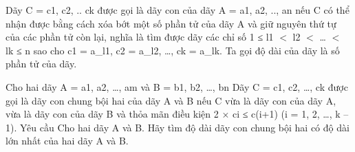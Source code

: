 Dãy C = c1, c2, .. ck được gọi là dãy con của dãy A = a1, a2, .., an nếu C có thể nhận được bằng cách xóa bớt một số phần tử của dãy A và giữ nguyên thứ tự của các phần tử còn lại, nghĩa là tìm được dãy các chỉ số 1 ≤ l1 $<$ l2 $<$ … $<$ lk ≤ n sao cho c1 = a\_l1, c2 = a\_l2, …, ck = a\_lk. Ta gọi độ dài của dãy là số phần tử của dãy.

Cho hai dãy A = a1, a2, …, am và B = b1, b2, …, bn Dãy C = c1, c2, …, ck được gọi là dãy con chung bội hai của dãy A và B nếu C vừa là dãy con của dãy A, vừa là dãy con của dãy B và thỏa mãn điều kiện 2 × ci ≤ c(i+1) (i = 1, 2, …, k – 1).
Yêu cầu
Cho hai dãy A và B. Hãy tìm độ dài dãy con chung bội hai có độ dài lớn nhất của hai dãy A và B.